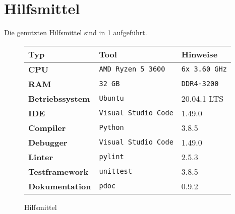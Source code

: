 \section{Hilfsmittel}
\label{sec:hilfsmittel}

Die genutzten Hilfsmittel sind in \ref{tab:tools} aufgeführt.

\begin{figure}[H]
    \centering
    \begin{tabular}{|l|l|l|}
        \hline
        \textbf{Typ}            & \textbf{Tool}               & \textbf{Hinweise}    \\
        \hline
        \hline
        \textbf{CPU}            & \texttt{AMD Ryzen 5 3600}   & \texttt{6x 3.60 GHz} \\
        \hline
        \textbf{RAM}            & \texttt{32 GB}              & \texttt{DDR4-3200}   \\
        \hline
        \hline
        \textbf{Betriebssystem} & \texttt{Ubuntu}             & 20.04.1 LTS          \\
        \hline
        \textbf{IDE}            & \texttt{Visual Studio Code} & 1.49.0               \\
        \hline
        \textbf{Compiler}       & \texttt{Python}             & 3.8.5                \\
        \hline
        \textbf{Debugger}       & \texttt{Visual Studio Code} & 1.49.0               \\
        \hline
        \textbf{Linter}         & \texttt{pylint}             & 2.5.3                \\
        \hline
        \textbf{Testframework}  & \texttt{unittest}           & 3.8.5                \\
        \hline
        \textbf{Dokumentation}  & \texttt{pdoc}               & 0.9.2                \\
        \hline
    \end{tabular}
    \caption{Hilfsmittel}
    \label{tab:tools}
\end{figure}